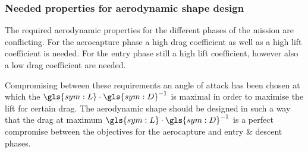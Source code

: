 \subsubsection{Needed properties for aerodynamic shape design} \label{sec:trajectory_summary}
The required aerodynamic properties for the different phases of the mission are conflicting. For the aerocapture phase a high drag coefficient as well as a high lift coefficient is needed. For the entry phase still a high lift coefficient, however also a low drag coefficient are needed.

Compromising between these requirements an angle of attack has been chosen at which the $\gls{sym:L}\cdot\gls{sym:D}^{-1}$ is maximal in order to maximise the lift for certain drag. The aerodynamic shape should be designed in such a way that the drag at maximum $\gls{sym:L}\cdot\gls{sym:D}^{-1}$ is a perfect compromise between the objectives for the aerocapture and entry \& descent phases.
